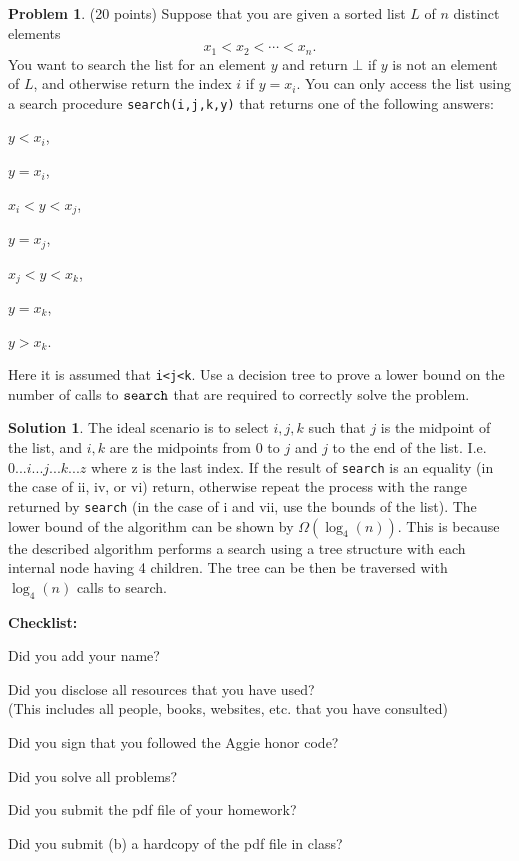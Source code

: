 \documentclass{article}
\theoremstyle{definition}
\newtheorem{problem}{Problem}
\newtheorem*{solution}{Solution}
\newcommand{\checklist}{\noindent\textbf{Checklist:}
\begin{compactitem}[$\Box$] 
\item Did you add your name? 
\item Did you disclose all resources that you have used? \\
(This includes all people, books, websites, etc. that you have consulted)
\item Did you sign that you followed the Aggie honor code? 
\item Did you solve all problems? 
\item Did you submit the pdf file of your homework?
\item Did you submit (b) a hardcopy of the pdf file in class? 
\end{compactitem}
}
\begin{document}
\begin{problem}(20 points)
 Suppose that you are given a sorted list $L$ of $n$ distinct
elements
$$ x_1 < x_2 < \cdots < x_n.$$ 
You want to search the list for an element $y$ and return $\bot$ if
$y$ is not an element of $L$, and otherwise return the index $i$ if
$y=x_i$. You can only access the list using a search procedure 
\verb|search(i,j,k,y)| that returns one of the following answers: 
\begin{inparaenum}[(i)]
\item $y<x_i$,
\item $y=x_i$,
\item $x_i<y<x_j$,
\item $y=x_j$,
\item $x_j<y<x_k$,
\item $y=x_k$,
\item $y>x_k$.
\end{inparaenum}
Here it is assumed that \verb|i<j<k|. 
Use a decision tree to prove a lower bound on the number of calls to
$\verb|search|$ that are required to correctly solve the problem. 
\begin{solution}
The ideal scenario is to select $i, j, k$ such that $j$ is the midpoint of the list, and $i, k$ are the midpoints from 0 to $j$ and $j$ to the end of the list. I.e. $0 ... i ... j ... k ... z$ where z is the last index. If the result of \verb|search| is an equality (in the case of ii, iv, or vi) return, otherwise repeat the process with the range returned by \verb|search| (in the case of i and vii, use the bounds of the list). The lower bound of the algorithm can be shown by $\Omega(\log_4(n))$. This is because the described algorithm performs a search using a tree structure with each internal node having 4 children. The tree can be then be traversed with $\log_4(n)$ calls to search.
\end{solution}
\end{problem}










\medskip



\goodbreak
\checklist
\end{document}
